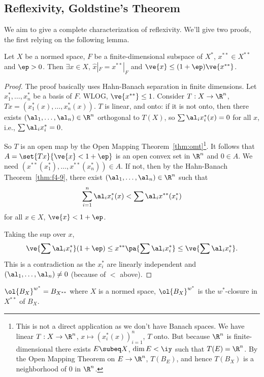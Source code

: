 \subsection{Reflexivity, Goldstine's Theorem}
We aim to give a complete characterization of reflexivity. We'll give two proofs, the first relying on the following lemma.
\begin{lem}
Let $X$ be a normed space, $ F$ be a finite-dimensional subspace of $X^*$, $x^{**}\in X^{**}$ and $\ep>0$. Then $\exists x\in X$, $\hat x|_{F}=x^{**}|_F$ and $\ve{x}\le (1+\ep)\ve{x^{**}}$. 
\end{lem}
\begin{proof}
The proof basically uses Hahn-Banach separation in finite dimensions. Let $x_1^*,\ldots, x_n^*$ be a basis of $F$. WLOG, $\ve{x^{**}}\le 1$. Consider $T:X\to \R^n$, $Tx=(x_1^*(x),\ldots, x_n^*(x))$. $T$ is linear, and onto: if it is not onto, then there exists $(\al_1,\ldots, \al_n)\in \R^n$ orthogonal to $T(X)$, so $\sum \al_ix_i^*(x)=0$ for all $x$, i.e., $\sum \al_ix_i^* = 0$.

So $T$ is an open map by the Open Mapping Theorem~\ref{thm:omt}\footnote{This is not a direct application as we don't have Banach spaces. We have linear $T:X\to \R^n$, $x\mapsto (x_i^*(x))_{i=1}^n$, $T$ onto. But because $\R^n$ is finite-dimensional there exists $E\subeq X$, $\dim E<\iy$ such that $T(E)=\R^n$. By the Open Mapping Theorem on $E\to \R^n$, $T(B_E)$, and hence $T(B_X)$ is a neighborhood of 0 in $\R^n$.}. It follows that $A=\set{Tx}{\ve{x}<1+\ep}$ is an open convex set in $\R^n$ and $0\in A$. We need $(x^{**}(x_1^*),\ldots, x^{**}(x_n^*))\in A$. If not, then by the Hahn-Banach Theorem~\ref{thm:f4-9}, there exist $(\al_1,\ldots, \al_n)\in \R^n$ such that \[\sum_{i=1}^n \al_ix_i^*(x)<\sum\al_ix^{**}(x_i^*)\]
for all $x\in X$, $\ve{x}<1+\ep$. 

Taking the sup over $x$, 
\[%
\ve{\sum \al_ix_i^*}(1+\ep)\le x^{**}\pa{\sum \al_ix_i^*} \le \ve{\sum \al_ix_i^*}.
\]
This is a contradiction as the $x_i^*$ are linearly independent and $(\al_1,\ldots, \al_n)\ne 0$ (because of $<$ above). 
\end{proof}
\begin{thm}
$\ol{B_X}^{w^*}=B_{X^{**}}$ where $X$ is a normed space, $\ol{B_X}^{w^*}$ is the $w^*$-closure in $X^{**}$ of $B_X$.
\end{thm}

